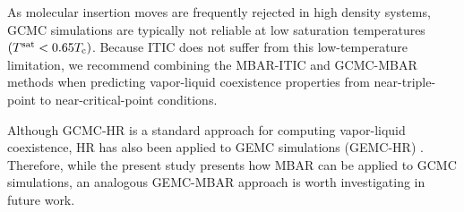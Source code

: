 \documentclass[journal=jced,manuscript=article]{achemso}
\begin{document}





As molecular insertion moves are frequently rejected in high density systems, GCMC simulations are typically not reliable at low saturation temperatures $(T^{\rm sat} < 0.65 T_{\rm c})$. Because ITIC does not suffer from this low-temperature limitation, we recommend combining the MBAR-ITIC and GCMC-MBAR methods when predicting vapor-liquid coexistence properties from near-triple-point to near-critical-point conditions.

Although GCMC-HR is a standard approach for computing vapor-liquid coexistence, HR has also been applied to GEMC simulations (GEMC-HR) \cite{Boulougouris2010}. Therefore, while the present study presents how MBAR can be applied to GCMC simulations, an analogous GEMC-MBAR approach is worth investigating in future work.


\end{document}
